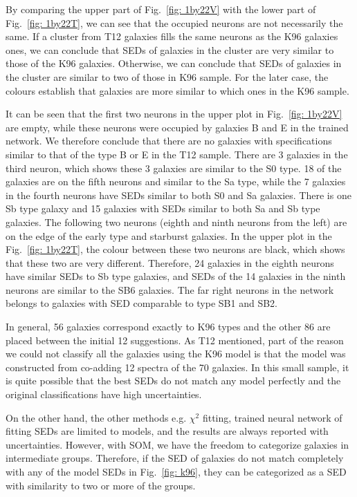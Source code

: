             By comparing the upper part of Fig.~\ref{fig: 1by22V} with the lower part of Fig.~\ref{fig: 1by22T}, we can see that the occupied neurons are not necessarily the same.
            If a cluster from T12 galaxies fills the same neurons as the K96 galaxies ones, we can conclude that SEDs of galaxies in the cluster are very similar to those of the K96 galaxies.
            Otherwise, we can conclude that SEDs of galaxies in the cluster are similar to two of those in K96 sample.
            For the later case, the colours establish that galaxies are more similar to which ones in the K96 sample.
            
            It can be seen that the first two neurons in the upper plot in Fig.~\ref{fig: 1by22V} are empty, while these neurons were occupied by galaxies B and E in the trained network.
            We therefore conclude that there are no galaxies with specifications similar to that of the type B or E in the T12 sample.
            There are 3 galaxies in the third neuron, which shows these 3 galaxies are similar to the S0 type. 
            18 of the galaxies are on the fifth neurons and similar to the Sa type, while the 7 galaxies in the fourth neurons have SEDs similar to both S0 and Sa galaxies.
            There is one Sb type galaxy and 15 galaxies with SEDs similar to both Sa and Sb type galaxies.
            The following two neurons (eighth and ninth neurons from the left) are on the edge of the early type and starburst galaxies.
            In the upper plot in the  Fig.~\ref{fig: 1by22T}, the colour between these two neurons are black, which shows that these two are very different.
            Therefore, 24 galaxies in the eighth neurons have similar SEDs to Sb type galaxies, and SEDs of the 14 galaxies in the ninth neurons are similar to the SB6 galaxies.
            The far right neurons in the network belongs to galaxies with SED comparable to type SB1 and SB2.
            
            In general, 56 galaxies correspond exactly to K96 types and the other 86 are placed between the initial 12 suggestions.
            As T12 mentioned, part of the reason we could not classify all the galaxies using the K96 model is that the model was constructed from co-adding 12 spectra of the 70 galaxies.
            In this small sample, it is quite possible that the best SEDs do not match any model perfectly and the original classifications have high uncertainties.
            
            On the other hand, the other methods e.g. $\chi^2$ fitting, trained neural network of fitting SEDs are limited to models, and the results are always reported with uncertainties.
            However, with SOM, we have the freedom to categorize galaxies in intermediate groups.
            Therefore, if the SED of galaxies do not match completely with any of the model SEDs in Fig.~\ref{fig: k96}, they can be categorized as a SED with similarity to two or more of the groups.

